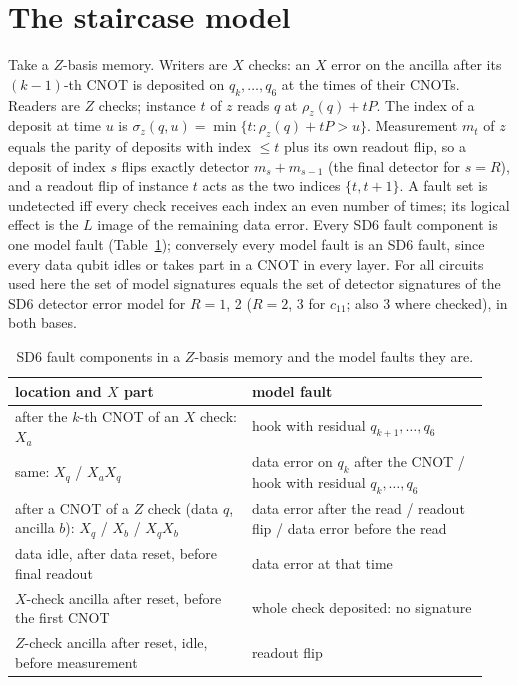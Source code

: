 \documentclass[aps,prl,twocolumn,superscriptaddress,nofootinbib]{revtex4-2}
\newif\ifshowclaimtags \showclaimtagsfalse
\newcommand{\cl}[1]{\ifshowclaimtags\textsuperscript{\textcolor{blue}{\scriptsize[#1]}}\fi}
\begin{document}
\section{The staircase model}\label{sm:model}\cl{L-24}
Take a $Z$-basis memory. Writers are $X$ checks: an $X$ error on the ancilla after its
$(k-1)$-th CNOT is deposited on $q_k,\dots,q_6$ at the times of their CNOTs. Readers are $Z$
checks; instance $t$ of $z$ reads $q$ at $\rho_z(q)+tP$. The index of a deposit at time $u$
is $\sigma_z(q,u)=\min\{t:\rho_z(q)+tP>u\}$. Measurement $m_t$ of $z$ equals the parity of
deposits with index $\le t$ plus its own readout flip, so a deposit of index $s$ flips exactly
detector $m_s+m_{s-1}$ (the final detector for $s=R$), and a readout flip of instance $t$
acts as the two indices $\{t,t+1\}$. A fault set is undetected iff every check receives each
index an even number of times; its logical effect is the $L$ image of the remaining data
error. Every SD6 fault component is one model fault (Table~\ref{tab:model}); conversely every
model fault is an SD6 fault, since every data qubit idles or takes part in a CNOT in every
layer. For all circuits used here the set of model signatures equals the set of detector
signatures of the SD6 detector error model for $R=1$, 2 ($R=2$, 3 for $c_{11}$; also 3 where
checked), in both bases.

\begin{table}[h]
\caption{SD6 fault components in a $Z$-basis memory and the model faults they are.}
\label{tab:model}
\begin{ruledtabular}
\begin{tabular}{p{0.47\linewidth}p{0.47\linewidth}}
location and $X$ part & model fault\\
\hline
after the $k$-th CNOT of an $X$ check: $X_a$ & hook with residual $q_{k+1},\dots,q_6$\\
same: $X_q$ / $X_aX_q$ & data error on $q_k$ after the CNOT / hook with residual $q_k,\dots,q_6$\\
after a CNOT of a $Z$ check (data $q$, ancilla $b$): $X_q$ / $X_b$ / $X_qX_b$ & data error after the read / readout flip / data error before the read\\
data idle, after data reset, before final readout & data error at that time\\
$X$-check ancilla after reset, before the first CNOT & whole check deposited: no signature\\
$Z$-check ancilla after reset, idle, before measurement & readout flip\\
\end{tabular}
\end{ruledtabular}
\end{table}
\end{document}
